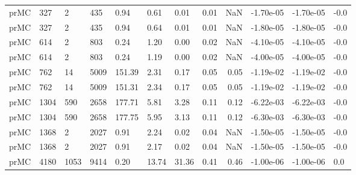 \begin{tabular}{lllllllrrlll}
prMC &    327 &          2 &         435 &      0.94 &             0.61 &                         0.01 &                0.01 &                  NaN &        -1.70e-05 &       -1.70e-05 &         -0.0 \\
prMC &    327 &          2 &         435 &      0.94 &             0.64 &                         0.01 &                0.01 &                  NaN &        -1.80e-05 &       -1.80e-05 &         -0.0 \\
prMC &    614 &          2 &         803 &      0.24 &             1.20 &                         0.00 &                0.02 &                  NaN &        -4.10e-05 &       -4.10e-05 &         -0.0 \\
prMC &    614 &          2 &         803 &      0.24 &             1.19 &                         0.00 &                0.02 &                  NaN &        -4.00e-05 &       -4.00e-05 &         -0.0 \\
prMC &    762 &         14 &        5009 &    151.39 &             2.31 &                         0.17 &                0.05 &                 0.05 &        -1.19e-02 &       -1.19e-02 &         -0.0 \\
prMC &    762 &         14 &        5009 &    151.31 &             2.34 &                         0.17 &                0.05 &                 0.05 &        -1.19e-02 &       -1.19e-02 &         -0.0 \\
prMC &   1304 &        590 &        2658 &    177.71 &             5.81 &                         3.28 &                0.11 &                 0.12 &        -6.22e-03 &       -6.22e-03 &         -0.0 \\
prMC &   1304 &        590 &        2658 &    177.75 &             5.95 &                         3.13 &                0.11 &                 0.12 &        -6.30e-03 &       -6.30e-03 &         -0.0 \\
prMC &   1368 &          2 &        2027 &      0.91 &             2.24 &                         0.02 &                0.04 &                  NaN &        -1.50e-05 &       -1.50e-05 &         -0.0 \\
prMC &   1368 &          2 &        2027 &      0.91 &             2.17 &                         0.02 &                0.04 &                  NaN &        -1.50e-05 &       -1.50e-05 &         -0.0 \\
prMC &   4180 &       1053 &        9414 &      0.20 &            13.74 &                        31.36 &                0.41 &                 0.46 &        -1.00e-06 &       -1.00e-06 &          0.0 \\

\end{tabular}

